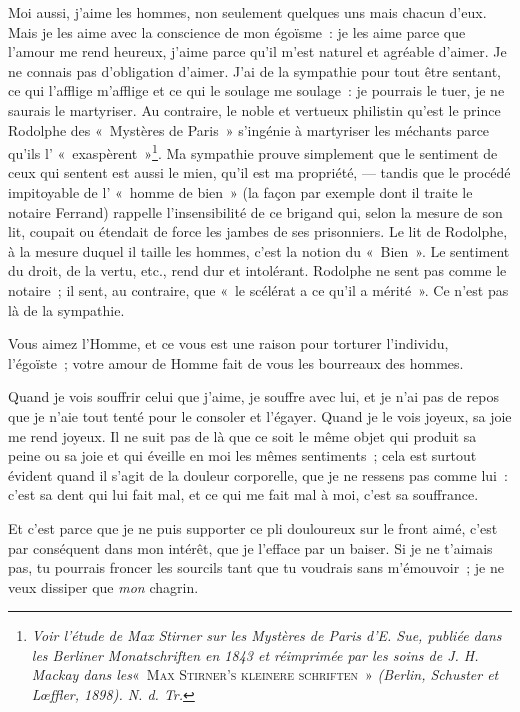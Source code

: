 \documentclass[french,twoside]{book} %
\begin{document}
Moi aussi, j’aime les hommes, non seulement quelques uns mais chacun d’eux. Mais je les aime avec la conscience de mon égoïsme : je les aime parce que  l’amour me rend heureux, j’aime parce qu’il m’est naturel et agréable d’aimer. Je ne connais pas d’obligation d’aimer. J’ai de la sympathie pour tout être sentant, ce qui l’afflige m’afflige et ce qui le soulage me soulage : je pourrais le tuer, je ne saurais le martyriser. Au contraire, le noble et vertueux philistin qu’est le prince Rodolphe des « Mystères de Paris » s’ingénie à martyriser les méchants parce qu’ils l’ « exaspèrent »\footnote{ \noindent \emph{Voir l’étude de Max Stirner sur les Mystères de Paris d’E. Sue, publiée dans les Berliner Monatschriften en 1843 et réimprimée par les soins de J. H. Mackay dans les}« M{\scshape ax} S{\scshape tirner’s kleinere schriften} » \emph{(Berlin, Schuster et Lœffler, 1898). N. d. Tr.}
 }. Ma sympathie prouve simplement que le sentiment de ceux qui sentent est aussi le mien, qu’il est ma propriété, — tandis que le procédé impitoyable de l’ « homme de bien » (la façon par exemple dont il traite le notaire Ferrand) rappelle l’insensibilité de ce brigand qui, selon la mesure de son lit, coupait ou étendait de force les jambes de ses prisonniers. Le lit de Rodolphe, à la mesure duquel il taille les hommes, c’est la notion du « Bien ». Le sentiment du droit, de la vertu, etc., rend dur et intolérant. Rodolphe ne sent pas comme le notaire ; il sent, au contraire, que « le scélérat a ce qu’il a mérité ». Ce n’est pas là de la sympathie.\par
Vous aimez l’Homme, et ce vous est une raison pour torturer l’individu, l’égoïste ; votre amour de Homme fait de vous les bourreaux des hommes.\par
Quand je vois souffrir celui que j’aime, je souffre avec lui, et je n’ai pas de repos que je n’aie tout tenté pour le consoler et l’égayer. Quand je le vois joyeux, sa joie me rend joyeux. Il ne suit pas de là que ce soit le même objet qui produit sa peine ou sa joie et qui éveille en moi les mêmes sentiments ; cela est surtout évident quand il s’agit de la douleur corporelle, que je ne ressens pas comme lui : c’est sa dent qui lui fait mal, et ce qui me fait mal à moi, c’est sa souffrance.\par
 Et c’est parce que je ne puis supporter ce pli douloureux sur le front aimé, c’est par conséquent dans mon intérêt, que je l’efface par un baiser. Si je ne t’aimais pas, tu pourrais froncer les sourcils tant que tu voudrais sans m’émouvoir ; je ne veux dissiper que \emph{mon} chagrin.\par
\end{document}
